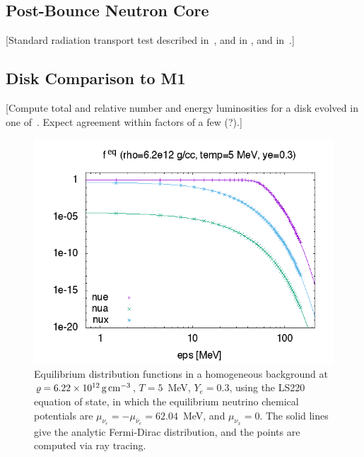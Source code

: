 \documentclass[aps,floatfix,prd,superscriptaddress,twocolumn]{revtex4-1}
\newcommand{\todo}[1]{\marginpar{\tiny{\textcolor{red}{#1}}}}
\begin{document}
\subsection{Post-Bounce Neutron Core}
\label{ssec:test_bounce_core}
[Standard radiation transport test described in~\cite{ocon2015-gr1d_with_nu},
and in \cite[App.~E.6]{fouc2015-m1_nsbh},
and in~\cite{abdi2012-monte_carlo}.]
\todo{Evan: provide initial data and $H^r(\varepsilon)$}
\todo{Jerred: setup and run test}

\subsection{Disk Comparison to M1}
\label{ssec:test_disk_comparison}
[Compute total and relative number and energy luminosities for a disk evolved
in one of~\cite{fouc2015-m1_nsbh, fouc2016-m1_nsns, fouc2016-m1_evolve_n}.
Expect agreement within factors of a few (?).]
\todo{code up moment integrals}
\todo{compute luminosities from M1}
\todo{compute luminosities from ray tracing}

\begin{figure}
  \includegraphics[width=\columnwidth]{fig-homogeneous_isotropic}
  \caption{
    Equilibrium distribution functions in a homogeneous background at
    $\varrho=6.22 \times 10^{12}\,{\rm g}\,{\rm cm}^{-3}$,
    $T=5$~MeV,
    $Y_e=0.3$,
    using the LS220 equation of state, in which the equilibrium
    neutrino chemical potentials are
    $\mu_{\nu_e}=-\mu_{\bar{\nu}_e}=62.04$~MeV, and 
    $\mu_{\nu_x}=0$.
    The solid lines give the analytic Fermi-Dirac distribution,
    and the points are computed via ray tracing.}
  \label{fig:homogeneous_isotropic}
\end{figure}
\end{document}
